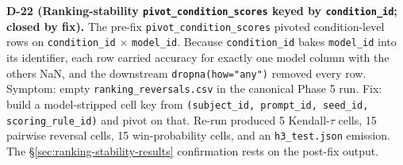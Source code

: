 \documentclass[11pt]{article}
\begin{document}
\textbf{D-22 (Ranking-stability \texttt{pivot\_condition\_scores} keyed by \texttt{condition\_id}; closed by fix).} The pre-fix \texttt{pivot\_condition\_scores} pivoted condition-level rows on \texttt{condition\_id} $\times$ \texttt{model\_id}. Because \texttt{condition\_id} bakes \texttt{model\_id} into its identifier, each row carried accuracy for exactly one model column with the others NaN, and the downstream \texttt{dropna(how="any")} removed every row. Symptom: empty \texttt{ranking\_reversals.csv} in the canonical Phase 5 run. Fix: build a model-stripped cell key from \texttt{(subject\_id, prompt\_id, seed\_id, scoring\_rule\_id)} and pivot on that. Re-run produced 5 Kendall-$\tau$ cells, 15 pairwise reversal cells, 15 win-probability cells, and an \texttt{h3\_test.json} emission. The §\ref{sec:ranking-stability-results} confirmation rests on the post-fix output.
\end{document}
